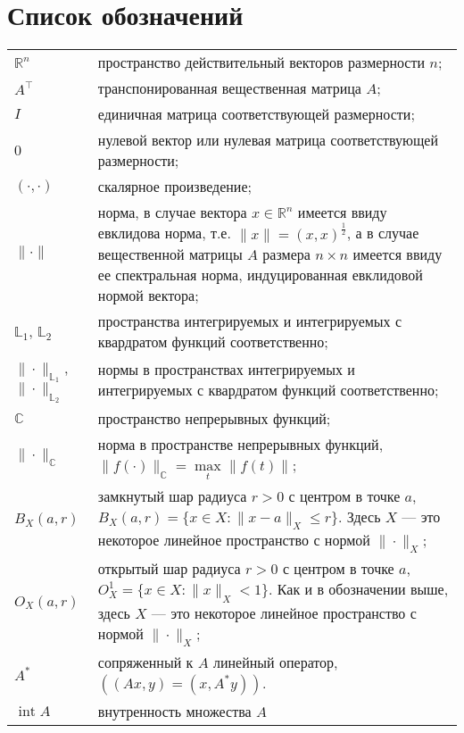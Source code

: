 \documentclass[../main.tex]{subfiles}
\begin{document}
\clearpage
\section*{Список обозначений}
\begin{tabularx}{\textwidth}{lY}
	$\mathbb{R}^n$ & пространство действительный векторов размерности $n$; \\ 
	$A^{\top}$ & транспонированная вещественная матрица $A$; \\ 
	$I$ & единичная матрица соответствующей размерности; \\ 
	$0$ & нулевой вектор или нулевая матрица соответствующей размерности; \\
	$(\cdot,\cdot)$ & скалярное произведение; \\
	$\| \cdot\| $ &  норма, в случае вектора $x \in \mathbb{R}^n$ имеется ввиду евклидова норма,  т.е. $\|x\| = (x,x)^{\frac{1}{2}}$, а в случае вещественной  матрицы $A$ размера $n \times n$ имеется ввиду ее спектральная норма, индуцированная евклидовой нормой вектора; \\
	$\mathbb{L}_1$, $\mathbb{L}_2$ & пространства интегрируемых и интегрируемых с квардратом функций соответственно; \\
	$\|\cdot\|_{\mathbb{L}_1}$, $\|\cdot\|_{\mathbb{L}_2}$ & нормы в пространствах интегрируемых и интегрируемых с квардратом функций соответственно; \\
	$ \mathbb{C} $ & пространство непрерывных функций; \\
	$\|\cdot\|_\mathbb{C}$ & норма в пространстве непрерывных функций, $\|f(\cdot) \|_\mathbb{C} = \max\limits_{t} \|f(t)\|$; \\
	$B_X(a,r)$ & замкнутый шар радиуса $r>0$ с центром в точке $a$, $B_X(a, r) = \{x\in X: \|x-a\|_X \leqslant r \}$. Здесь $X$ --- это некоторое линейное пространство с нормой $\|\cdot\|_X$; \\
	$O_{X}(a, r)$  & открытый шар радиуса $r>0$ с центром в точке $a$, $O_{X}^1 = \{x\in X: \|x\|_{X} < 1 \}$. Как и в обозначении выше, здесь $X$ --- это некоторое линейное пространство с нормой $\|\cdot\|_X$; \\
	$ A^* $ & сопряженный к $A$ линейный оператор, $((Ax, y) = (x, A^*y))$. \\
	$ \operatorname{int}A $   & внутренность множества $A$ \\
\end{tabularx}
\end{document}
